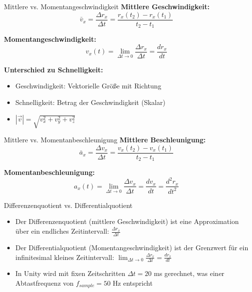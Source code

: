 \begin{definition}{Mittlere vs. Momentangeschwindigkeit}
    \textbf{Mittlere Geschwindigkeit:}
    \begin{equation}
        \bar{v}_x = \frac{\Delta r_x}{\Delta t} = \frac{r_x(t_2) - r_x(t_1)}{t_2 - t_1}
    \end{equation}
    
    \textbf{Momentangeschwindigkeit:}
    \begin{equation}
        v_x(t) = \lim_{\Delta t \to 0} \frac{\Delta r_x}{\Delta t} = \frac{dr_x}{dt}
    \end{equation}
    
    \textbf{Unterschied zu Schnelligkeit:}
    \begin{itemize}
        \item Geschwindigkeit: Vektorielle Größe mit Richtung
        \item Schnelligkeit: Betrag der Geschwindigkeit (Skalar)
        \item $|\vec{v}| = \sqrt{v_x^2 + v_y^2 + v_z^2}$
    \end{itemize}
\end{definition}

\begin{definition}{Mittlere vs. Momentanbeschleunigung}
    \textbf{Mittlere Beschleunigung:}
    \begin{equation}
        \bar{a}_x = \frac{\Delta v_x}{\Delta t} = \frac{v_x(t_2) - v_x(t_1)}{t_2 - t_1}
    \end{equation}
    
    \textbf{Momentanbeschleunigung:}
    \begin{equation}
        a_x(t) = \lim_{\Delta t \to 0} \frac{\Delta v_x}{\Delta t} = \frac{dv_x}{dt} = \frac{d^2r_x}{dt^2}
    \end{equation}
\end{definition}

\begin{concept}{Differenzenquotient vs. Differentialquotient}
    \begin{itemize}
        \item Der Differenzenquotient (mittlere Geschwindigkeit) ist eine Approximation über ein endliches Zeitintervall: $\frac{\Delta r_x}{\Delta t}$
        \item Der Differentialquotient (Momentangeschwindigkeit) ist der Grenzwert für ein infinitesimal kleines Zeitintervall: $\lim_{\Delta t \to 0} \frac{\Delta r_x}{\Delta t} = \frac{dr_x}{dt}$
        \item In Unity wird mit fixen Zeitschritten $\Delta t = 20$ ms gerechnet, was einer Abtastfrequenz von $f_{sample} = 50$ Hz entspricht
    \end{itemize}
\end{concept}

